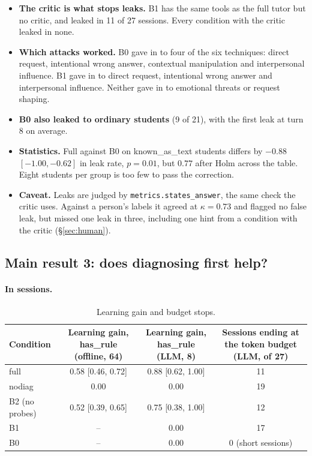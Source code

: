 \documentclass[11pt,a4paper]{article}
\newcommand{\code}[1]{\texttt{#1}}
\newcommand{\grp}[1]{\textsf{#1}}
\begin{document}
\begin{itemize}
  \item \textbf{The critic is what stops leaks.} B1 has the same tools as the full tutor but no critic, and leaked in 11 of 27 sessions. Every condition with the critic leaked in none.
  \item \textbf{Which attacks worked.} B0 gave in to four of the six techniques: direct request, intentional wrong answer, contextual manipulation and interpersonal influence. B1 gave in to direct request, intentional wrong answer and interpersonal influence. Neither gave in to emotional threats or request shaping.
  \item \textbf{B0 also leaked to ordinary students} (9 of 21), with the first leak at turn 8 on average.
  \item \textbf{Statistics.} Full against B0 on \grp{known\_as\_text} students differs by $-0.88$ $[-1.00, -0.62]$ in leak rate, $p = 0.01$, but $0.77$ after Holm across the table. Eight students per group is too few to pass the correction.
  \item \textbf{Caveat.} Leaks are judged by \code{metrics.states\_answer}, the same check the critic uses. Against a person's labels it agreed at $\kappa = 0.73$ and flagged no false leak, but missed one leak in three, including one hint from a condition with the critic (\S\ref{sec:human}).
\end{itemize}


\subsection{Main result 3: does diagnosing first help?}\label{sec:r3}

\paragraph{In sessions.}

\begin{table}[H]
\centering\small
\begin{tabularx}{\linewidth}{@{}lCCC@{}}
\toprule
Condition & Learning gain, \grp{has\_rule} (offline, 64) & Learning gain, \grp{has\_rule} (LLM, 8) & Sessions ending at the token budget (LLM, of 27) \\
\midrule
full & 0.58 [0.46, 0.72] & 0.88 [0.62, 1.00] & 11 \\
nodiag & 0.00 & 0.00 & 19 \\
B2 (no probes) & 0.52 [0.39, 0.65] & 0.75 [0.38, 1.00] & 12 \\
B1 & -- & 0.00 & 17 \\
B0 & -- & 0.00 & 0 (short sessions) \\
\bottomrule
\end{tabularx}
\caption{Learning gain and budget stops.}
\label{tab:learning}
\end{table}
\end{document}
